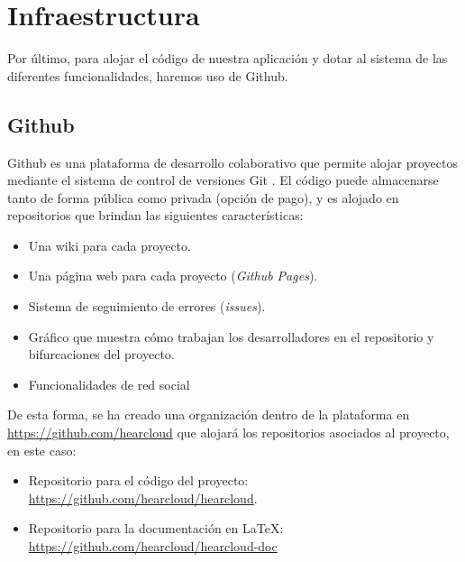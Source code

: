 \section{Infraestructura}

Por último, para alojar el código de nuestra aplicación y dotar al sistema de las diferentes funcionalidades, haremos uso de Github.

\subsection{Github}

Github \cite{Github} es una plataforma de desarrollo colaborativo que permite alojar proyectos mediante el sistema de control de versiones Git \cite{Git}. El código puede almacenarse tanto de forma pública como privada (opción de pago), y es alojado en repositorios que brindan las siguientes características:

\begin{itemize}
	\item Una wiki para cada proyecto.
	\item Una página web para cada proyecto (\textit{Github Pages}).
	\item Sistema de seguimiento de errores (\textit{issues}).
	\item Gráfico que muestra cómo trabajan los desarrolladores en el repositorio y bifurcaciones del proyecto.
	\item Funcionalidades de red social
\end{itemize}

De esta forma, se ha creado una organización dentro de la plataforma en \url{https://github.com/hearcloud} que alojará los repositorios asociados al proyecto, en este caso:

\begin{itemize}
	\item Repositorio para el código del proyecto: \url{https://github.com/hearcloud/hearcloud}.
	\item Repositorio para la documentación en {\LaTeX\xspace}: \url{https://github.com/hearcloud/hearcloud-doc}
\end{itemize}

